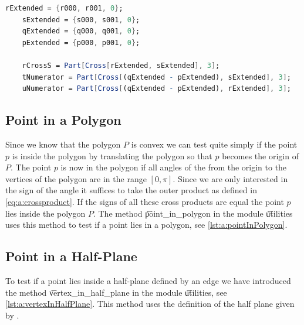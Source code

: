 	\begin{lstlisting}[float, language=Mathematica, label={lst:a:lineSegmentIntersectionMat}, caption={Mathematica code used to compute the value of \t{r_cross_s}, \t{u_numerator} and \t{t_numerator}.}]
	rExtended = {r000, r001, 0};
	sExtended = {s000, s001, 0};
	qExtended = {q000, q001, 0};
	pExtended = {p000, p001, 0};

	rCrossS = Part[Cross[rExtended, sExtended], 3];
	tNumerator = Part[Cross[(qExtended - pExtended), sExtended], 3];
	uNumerator = Part[Cross[(qExtended - pExtended), rExtended], 3];
	\end{lstlisting}

	

\subsection*{Point in a Polygon}
	Since we know that the polygon $P$ is convex we can test quite simply if the point $p$ is inside the polygon by translating the polygon so that $p$ becomes the origin of $P$. The point $p$ is now in the polygon if all angles of the from the origin to the vertices of the polygon are in the range $[0, \pi]$. Since we are only interested in the sign of the angle it suffices to take the outer product as defined in \autoref{eq:a:crossproduct}. If the signs of all these cross products are equal the point $p$ lies inside the polygon $P$. \cite{wolfram} The method \t{point_in_polygon} in the module \t{utilities} uses this method to test if a point lies in a polygon, see \autoref{lst:a:pointInPolygon}.

		

\subsection*{Point in a Half-Plane}
	To test if a point lies inside a half-plane defined by an edge we have introduced the method \t{vertex_in_half_plane} in the module \t{utilities}, see \autoref{lst:a:vertexInHalfPlane}. This method uses the definition of the half plane given by \citeauthor{o1982new}.

	

